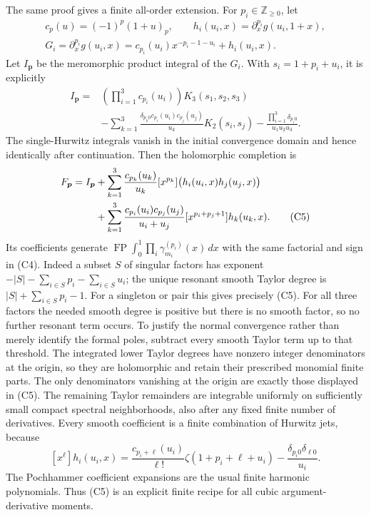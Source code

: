\documentclass[11pt,letterpaper]{article}
\numberwithin{equation}{section}
\theoremstyle{definition}
\theoremstyle{remark}
\begin{document}
The same proof gives a finite all-order extension. For
$p_i\in\mathbb Z_{\ge0}$, let
\begin{gather*}
 c_p(u)=(-1)^p(1+u)_p,\qquad
 h_i(u_i,x)=\partial_x^{p_i}g(u_i,1+x),\\
 G_i=\partial_x^{p_i}g(u_i,x)
     =c_{p_i}(u_i)x^{-p_i-1-u_i}+h_i(u_i,x).
\end{gather*}
Let $I_{\boldsymbol p}$ be the meromorphic product integral of the
$G_i$. With $s_i=1+p_i+u_i$, it is explicitly
\begin{align*}
 I_{\boldsymbol p}={}&\left(\prod_{i=1}^3 c_{p_i}(u_i)\right)
                         K_3(s_1,s_2,s_3)\\
 &-\sum_{k=1}^3\frac{\delta_{p_k0}c_{p_i}(u_i)c_{p_j}(u_j)}{u_k}
                         K_2(s_i,s_j)
 -\frac{\prod_{i=1}^3\delta_{p_i0}}{u_1u_2u_3}.
\end{align*}
The single-Hurwitz integrals vanish in the initial convergence domain
and hence identically after continuation.
Then the holomorphic completion is
\begin{align}
 F_{\boldsymbol p}=I_{\boldsymbol p}
 &+\sum_{k=1}^3\frac{c_{p_k}(u_k)}{u_k}
       [x^{p_k}]\bigl(h_i(u_i,x)h_j(u_j,x)\bigr)\notag\\
 &+\sum_{k=1}^3\frac{c_{p_i}(u_i)c_{p_j}(u_j)}{u_i+u_j}
       [x^{p_i+p_j+1}]h_k(u_k,x).             \tag{C5}\label{cub:C5}
\end{align}
Its coefficients generate
$\operatorname{FP}\int_0^1\prod_i\gamma_{m_i}^{(p_i)}(x)\,dx$ with
the same factorial and sign in (C4). Indeed a subset $S$ of singular
factors has exponent $-|S|-\sum_{i\in S}p_i-\sum_{i\in S}u_i$;
the unique resonant smooth Taylor degree is
$|S|+\sum_{i\in S}p_i-1$.  For a singleton or pair this gives precisely
(C5). For all three factors the needed smooth degree is positive but
there is no smooth factor, so no further resonant term occurs.
To justify the normal convergence rather than merely identify the
formal poles, subtract every smooth Taylor term up to that threshold.
The integrated lower Taylor degrees have nonzero integer denominators
at the origin, so they are holomorphic and retain their prescribed
monomial finite parts. The only denominators vanishing at the origin
are exactly those displayed in (C5). The remaining Taylor remainders
are integrable uniformly on sufficiently small compact spectral
neighborhoods, also after any fixed finite number of derivatives.
Every smooth coefficient is a finite combination of Hurwitz jets,
because
\[
 [x^\ell]h_i(u_i,x)
 =\frac{c_{p_i+\ell}(u_i)}{\ell!}
      \zeta(1+p_i+\ell+u_i)
   -\frac{\delta_{p_i0}\delta_{\ell0}}{u_i}.
\]
The Pochhammer coefficient expansions are the usual finite harmonic
polynomials. Thus (C5) is an explicit finite recipe for all cubic
argument-derivative moments.
\end{document}
